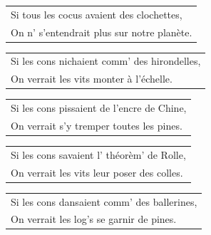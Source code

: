 \documentclass[a4paper, 14pt]{extarticle}
\begin{document}
\begin{flushleft}
\begin{tabularx}{0.8\textwidth} {
   >{\raggedright\arraybackslash}X}
Si tous les cocus avaient des clochettes,\\
On n’ s’entendrait plus sur notre planète.\\
\end{tabularx}
\end{flushleft}
\begin{flushleft}
\begin{tabularx}{0.8\textwidth} {
   >{\raggedright\arraybackslash}X}
Si les cons nichaient comm’ des hirondelles,\\
On verrait les vits monter à l’échelle.\\
\end{tabularx}
\end{flushleft}
\begin{flushleft}
\begin{tabularx}{0.8\textwidth} {
   >{\raggedright\arraybackslash}X}
Si les cons pissaient de l’encre de Chine,\\
On verrait s’y tremper toutes les pines.\\
\end{tabularx}
\end{flushleft}
\begin{flushleft}
\begin{tabularx}{0.8\textwidth} {
   >{\raggedright\arraybackslash}X}
Si les cons savaient l’ théorèm’ de Rolle, \\
On verrait les vits leur poser des colles. \\
\end{tabularx}
\end{flushleft}
\begin{flushleft}
\begin{tabularx}{0.8\textwidth} {
   >{\raggedright\arraybackslash}X}
Si les cons dansaient comm’ des ballerines, \\
On verrait les log’s se garnir de pines. \\
\end{tabularx}
\end{flushleft}
\end{document}
